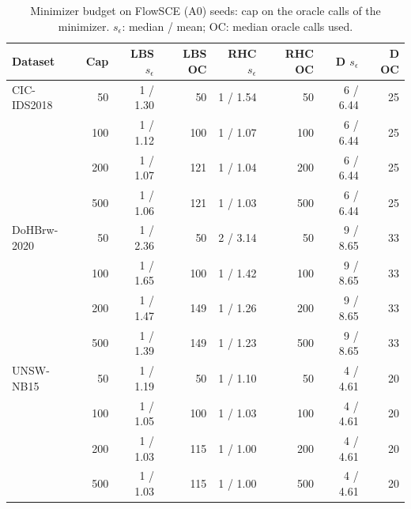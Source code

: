 \begin{table}[t]
\centering\footnotesize
\caption{Minimizer budget on FlowSCE (A0) seeds: cap on the oracle calls of the minimizer. $s_\epsilon$: median / mean; OC: median oracle calls used.}
\label{tab:a-budget}
\begin{tabular}{@{}lrrrrrrr@{}}
\toprule
Dataset & Cap & LBS $s_\epsilon$ & LBS OC & RHC $s_\epsilon$ & RHC OC & D $s_\epsilon$ & D OC \\
\midrule
CIC-IDS2018 & 50 & 1 / 1.30 & 50 & 1 / 1.54 & 50 & 6 / 6.44 & 25 \\
 & 100 & 1 / 1.12 & 100 & 1 / 1.07 & 100 & 6 / 6.44 & 25 \\
 & 200 & 1 / 1.07 & 121 & 1 / 1.04 & 200 & 6 / 6.44 & 25 \\
 & 500 & 1 / 1.06 & 121 & 1 / 1.03 & 500 & 6 / 6.44 & 25 \\
\midrule
DoHBrw-2020 & 50 & 1 / 2.36 & 50 & 2 / 3.14 & 50 & 9 / 8.65 & 33 \\
 & 100 & 1 / 1.65 & 100 & 1 / 1.42 & 100 & 9 / 8.65 & 33 \\
 & 200 & 1 / 1.47 & 149 & 1 / 1.26 & 200 & 9 / 8.65 & 33 \\
 & 500 & 1 / 1.39 & 149 & 1 / 1.23 & 500 & 9 / 8.65 & 33 \\
\midrule
UNSW-NB15 & 50 & 1 / 1.19 & 50 & 1 / 1.10 & 50 & 4 / 4.61 & 20 \\
 & 100 & 1 / 1.05 & 100 & 1 / 1.03 & 100 & 4 / 4.61 & 20 \\
 & 200 & 1 / 1.03 & 115 & 1 / 1.00 & 200 & 4 / 4.61 & 20 \\
 & 500 & 1 / 1.03 & 115 & 1 / 1.00 & 500 & 4 / 4.61 & 20 \\
\bottomrule
\end{tabular}
\end{table}
